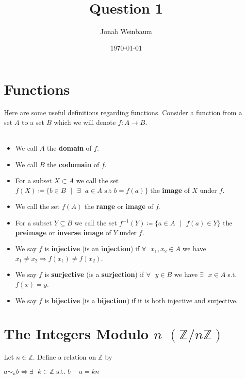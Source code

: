 \documentclass{article}
\begin{document}
\title{Question 1}
\author{Jonah Weinbaum}
\date{\today}
\maketitle

\section{Functions}

Here are some useful definitions regarding functions. Consider a function from a set $A$ to a set $B$ which we will denote $f: A\to B$.
\\\\
\begin{itemize}
\item We call $A$ the \textbf{domain} of $f$.
\item We call $B$ the \textbf{codomain} of $f$.
  \item For a subset $X\subset{A}$ we call the set $f(X) \coloneq \{b\in B \text{ }\vert\text{ }\exists\text{ }a\in{A}\text{ s.t }b=f(a)\}$ the \textbf{image} of $X$ under $f$.
\item We call the set $f(A)$ the \textbf{range} or \textbf{image} of $f$.
\item For a subset $Y\subseteq B$ we call the set $f^{-1}(Y) \coloneq \{a\in A\text{ }\vert\text{ }f(a) \in Y\}$ the \textbf{preimage} or \textbf{inverse image} of $Y$ under $f$.
\item We say $f$ is \textbf{injective} (is an \textbf{injection}) if $\forall\text{ }x_1, x_2\in {A}$ we have $x_1\ne x_2 \Rightarrow f(x_1) \ne f(x_2)$.
\item We say $f$ is \textbf{surjective} (is a \textbf{surjection}) if $\forall\text{ }y\in B$ we have $\exists\text{ }x\in A$ s.t. $f(x) = y$.
  \item We say $f$ is \textbf{bijective} (is a \textbf{bijection}) if it is both injective and surjective.
\end{itemize}


\section{The Integers Modulo $n$ $(\mathbb{Z}/n\mathbb{Z})$}

Let $n\in\mathbb{Z}$. Define a relation on $\mathbb{Z}$ by
\begin{center}
  $a\sim_{n} b \iff \exists\text{ }k\in\mathbb{Z}\text{ s.t. }b-a = kn$
\end{center}
\end{document}
